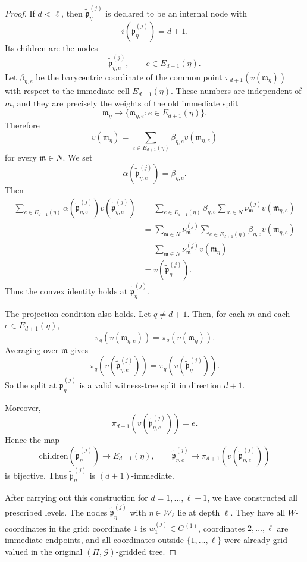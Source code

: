 \documentclass[10pt,a4paper]{amsart}
\providecommand{\cG}[0]{\ensuremath{\mathcal G}\xspace}
\newcommand{\fm}{\mathfrak{m}}
\newcommand{\fp}{\mathfrak{p}}
\begin{document}
\begin{proof}
If $d<\ell$, then $\widetilde{\fp}^{(j)}_\eta$ is declared to be an internal node
with
\[
  i(\widetilde{\fp}^{(j)}_\eta)=d+1.
\]
Its children are the nodes
\[
  \widetilde{\fp}^{(j)}_{\eta,e},
  \qquad e\in E_{d+1}(\eta).
\]
Let $\beta_{\eta,e}$ be the barycentric coordinate of the common point
$\pi_{d+1}(v(\fm_\eta))$ with respect to the immediate cell
$E_{d+1}(\eta)$.  These numbers are independent of $m$, and they are
precisely the weights of the old immediate split
\[
  \fm_\eta\longrightarrow \{\fm_{\eta,e}:e\in E_{d+1}(\eta)\}.
\]
Therefore
\[
  v(\fm_\eta)
  =
  \sum_{e\in E_{d+1}(\eta)}
  \beta_{\eta,e}v(\fm_{\eta,e})
\]
for every $\fm\in N$.  We set
\[
  \alpha(\widetilde{\fp}^{(j)}_{\eta,e})=\beta_{\eta,e}.
\]
Then
\begin{align*}
  \sum_{e\in E_{d+1}(\eta)}
  \alpha(\widetilde{\fp}^{(j)}_{\eta,e})v(\widetilde{\fp}^{(j)}_{\eta,e})
  &=
  \sum_{e\in E_{d+1}(\eta)}
  \beta_{\eta,e}
  \sum_{\fm\in N}\nu_\fm^{(j)}v(\fm_{\eta,e})       \\
  &=
  \sum_{\fm\in N}\nu_\fm^{(j)}
  \sum_{e\in E_{d+1}(\eta)}
  \beta_{\eta,e}v(\fm_{\eta,e})                 \\
  &=
  \sum_{\fm\in N}\nu_\fm^{(j)}v(\fm_\eta)            \\
  &=
  v(\widetilde{\fp}^{(j)}_\eta).
\end{align*}
Thus the convex identity holds at $\widetilde{\fp}^{(j)}_\eta$.

The projection condition also holds. Let $q\neq d+1$.  Then, for
each $m$ and each $e\in E_{d+1}(\eta)$,
\[
  \pi_q(v(\fm_{\eta,e}))=\pi_q(v(\fm_\eta)).
\]
Averaging over $\fm$ gives
\[
  \pi_q(v(\widetilde{\fp}^{(j)}_{\eta,e}))
  =
  \pi_q(v(\widetilde{\fp}^{(j)}_\eta)).
\]
So the split at $\widetilde{\fp}^{(j)}_\eta$ is a valid witness-tree split in
direction $d+1$.

Moreover,
\[
  \pi_{d+1}(v(\widetilde{\fp}^{(j)}_{\eta,e}))=e.
\]
Hence the map
\[
  \mathrm{children}(\widetilde{\fp}^{(j)}_\eta)\longrightarrow E_{d+1}(\eta),
  \qquad
  \widetilde{\fp}^{(j)}_{\eta,e}\longmapsto
  \pi_{d+1}(v(\widetilde{\fp}^{(j)}_{\eta,e}))
\]
is bijective.  Thus $\widetilde{\fp}^{(j)}_\eta$ is $(d+1)$-immediate.

After carrying out this construction for $d=1,\ldots,\ell-1$, we have
constructed all prescribed levels.  The nodes $\widetilde{\fp}^{(j)}_\eta$ with
$\eta\in\mathcal W_\ell$ lie at depth $\ell$.  They have all
$W$-coordinates in the grid:
coordinate $1$ is $w_1^{(j)}\in G^{(1)}$, coordinates
$2,\ldots,\ell$ are immediate endpoints, and all coordinates outside
$\{1,\ldots,\ell\}$ were already grid-valued in the original
$(\Pi,\cG)$-gridded tree.


\end{proof}
\end{document}
